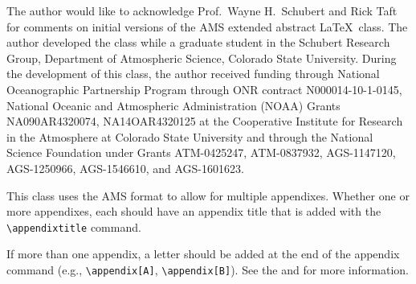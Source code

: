 \documentclass[9pt]{ametsocextabs}
\begin{document}
%
\acknowledgments
The author would like to acknowledge Prof.\ Wayne H.\ Schubert and
Rick Taft for comments on initial versions of the AMS extended
abstract \LaTeX\ class. The author developed the class while a
graduate student in the Schubert Research Group,
Department of Atmospheric Science, Colorado State University. During
the development of this class, the author received funding through
National Oceanographic Partnership Program through ONR contract
N000014-10-1-0145, National Oceanic and Atmospheric Administration
(NOAA) Grants NA090AR4320074, NA14OAR4320125 at the Cooperative
Institute for Research in the Atmosphere at Colorado State
University and through the National Science Foundation under Grants
ATM-0425247, ATM-0837932, AGS-1147120, AGS-1250966, AGS-1546610, and
AGS-1601623.

\appendix
{}
This class uses the AMS format to allow for multiple appendixes.
Whether one or more appendixes, each should have an appendix title
that is added with the \texttt{\textbackslash appendixtitle}
command.

If more than one appendix, a letter should be added at the end of
the appendix command (e.g., \texttt{\textbackslash appendix[A]},
\texttt{\textbackslash appendix[B]}). See the \citet{AMS2025latex}
and \citet{AMS2025doc} for more information.



\end{document}
